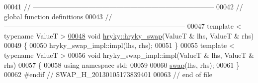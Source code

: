 \begin{DoxyCode}
00041 \textcolor{comment}{//
      ------------------------------------------------------------------------------}
00042 \textcolor{comment}{// global function definitions}
00043 \textcolor{comment}{//
      ------------------------------------------------------------------------------}
00047 \textcolor{comment}{}\textcolor{keyword}{template} < \textcolor{keyword}{typename} ValueT >
\hypertarget{swap_8h_source_l00048}{}\hyperlink{namespacehryky_add9c1c1fdfda07cd47bcb7c16d3a823a}{00048} \textcolor{keywordtype}{void} \hyperlink{namespacehryky_add9c1c1fdfda07cd47bcb7c16d3a823a}{hryky::hryky_swap}(ValueT & lhs, ValueT & rhs)
00049 \{
00050     hryky\_swap\_impl::impl(lhs, rhs);
00051 \}
00055 \textcolor{keyword}{template} < \textcolor{keyword}{typename} ValueT >
00056 \textcolor{keywordtype}{void} hryky\_swap\_impl::impl(ValueT & lhs, ValueT & rhs)
00057 \{
00058     \textcolor{keyword}{using namespace }std;
00059     
00060     \hyperlink{namespacehryky_a4282146df5ea2b68cb667896a2205909}{swap}(lhs, rhs);
00061 \}
00062 \textcolor{preprocessor}{#endif // SWAP\_H\_20130105173839401}
00063 \textcolor{preprocessor}{}\textcolor{comment}{// end of file}
\end{DoxyCode}
